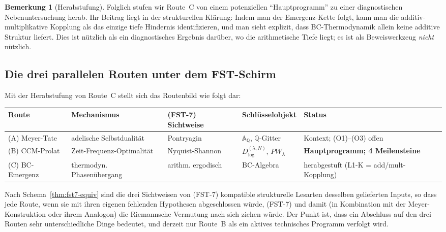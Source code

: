 \documentclass[11pt,a4paper]{article}
\theoremstyle{plain}
\theoremstyle{definition}
\newtheorem{remark}[theorem]{Bemerkung}
\newcommand{\Q}{\mathbb{Q}}
\newcommand{\A}{\mathbb{A}}
\begin{document}
\begin{remark}[Herabstufung]
\label{rem:route-c-demotion}
Folglich stufen wir Route~C von einem potenziellen ``Hauptprogramm'' zu einer
diagnostischen Nebenuntersuchung herab. Ihr Beitrag liegt in der strukturellen Klärung:
Indem man der Emergenz-Kette folgt, kann man die additiv-multiplikative
Kopplung als das einzige tiefe Hindernis identifizieren, und man sieht explizit, dass
BC-Thermodynamik allein keine additive Struktur liefert. Dies ist nützlich als ein
diagnostisches Ergebnis darüber, wo die arithmetische Tiefe liegt; es ist
als Beweiswerkzeug \emph{nicht} nützlich.
\end{remark}

\subsection{Die drei parallelen Routen unter dem FST-Schirm}
\label{sec:three-routes}

Mit der Herabstufung von Route~C stellt sich das Routenbild wie folgt dar:

\begin{center}
\small
\begin{tabular}{@{}L{0.12\textwidth}L{0.18\textwidth}L{0.18\textwidth}L{0.20\textwidth}L{0.22\textwidth}@{}}
\toprule
\textbf{Route} & \textbf{Mechanismus} & \textbf{(FST-7) Sichtweise} &
\textbf{Schlüsselobjekt} & \textbf{Status} \\
\midrule
(A) Meyer-Tate      & adelische Selbstdualität & Pontryagin        &
$\A_\Q$, $\Q$-Gitter & Kontext; (O1)--(O3) offen \\
(B) CCM-Prolat      & Zeit-Frequenz-Optimalität & Nyquist-Shannon &
$D^{(\lambda,N)}_{\log}$, $PW_\lambda$ & \textbf{Hauptprogramm; 4 Meilensteine} \\
(C) BC-Emergenz     & thermodyn. Phasenübergang & arithm. ergodisch &
BC-Algebra            & herabgestuft (L1-K = add/mult-Kopplung) \\
\bottomrule
\end{tabular}
\end{center}

Nach Schema~\ref{thm:fst7-equiv} sind die drei Sichtweisen von (FST-7)
kompatible strukturelle Lesarten desselben gelieferten Inputs, so dass jede
Route, wenn sie mit ihren eigenen fehlenden Hypothesen abgeschlossen würde,
(FST-7) und damit (in Kombination mit der Meyer-Konstruktion oder ihrem
Analogon) die Riemannsche Vermutung nach sich ziehen würde.
Der Punkt ist, dass ein Abschluss auf den drei Routen sehr unterschiedliche Dinge bedeutet, und
derzeit nur Route~B als ein aktives technisches Programm verfolgt wird.
\end{document}
